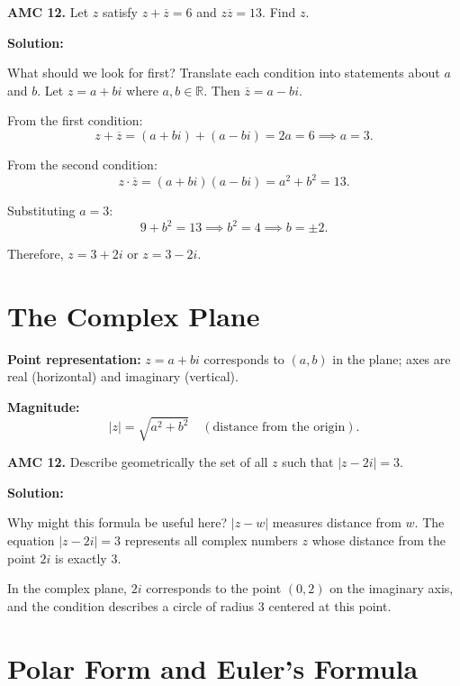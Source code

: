 \documentclass[12pt]{extarticle}
\begin{document}
\begin{examplebox}
\textbf{AMC 12.} Let $z$ satisfy $z+\overline{z}=6$ and $z\overline{z}=13$. Find $z$.
\end{examplebox}

\textbf{Solution:}

What should we look for first? Translate each condition into statements about $a$ and $b$.
Let $z = a + bi$ where $a, b \in \mathbb{R}$. Then $\overline{z} = a - bi$.

From the first condition:
\[
z + \overline{z} = (a + bi) + (a - bi) = 2a = 6 \implies a = 3.
\]

From the second condition:
\[
z \cdot \overline{z} = (a + bi)(a - bi) = a^2 + b^2 = 13.
\]

Substituting $a = 3$:
\[
9 + b^2 = 13 \implies b^2 = 4 \implies b = \pm 2.
\]

Therefore, $z = 3 + 2i$ or $z = 3 - 2i$.


\section{The Complex Plane}

\textbf{Point representation:} $z=a+bi$ corresponds to $(a,b)$ in the plane; axes are real (horizontal) and imaginary (vertical).

\textbf{Magnitude:}
\[
 |z| = \sqrt{a^2 + b^2} \quad (\text{distance from the origin}).
\]

\begin{examplebox}
\textbf{AMC 12.} Describe geometrically the set of all $z$ such that $|z-2i|=3$.
\end{examplebox}

\textbf{Solution:}

Why might this formula be useful here? $|z - w|$ measures distance from $w$.
The equation $|z - 2i| = 3$ represents all complex numbers $z$ whose distance from the point $2i$ is exactly $3$.

In the complex plane, $2i$ corresponds to the point $(0, 2)$ on the imaginary axis, and the condition describes a circle of radius $3$ centered at this point.


\section{Polar Form and Euler's Formula}
\end{document}
